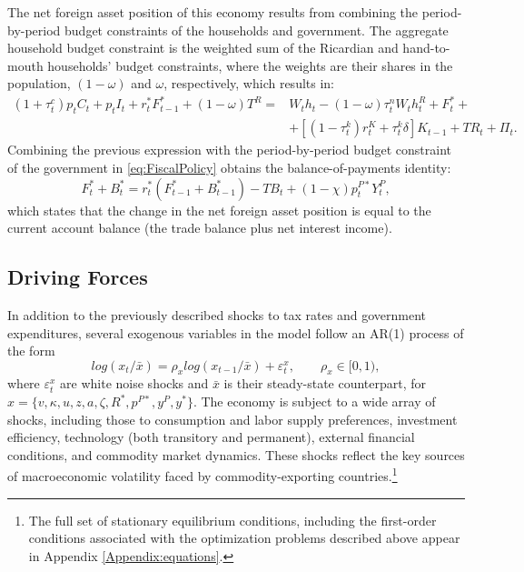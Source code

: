 \documentclass[12pt]{article}
\begin{document}
The net foreign asset position of this economy results from combining the period-by-period budget constraints of the households and government. The aggregate household budget constraint is the weighted sum of the Ricardian and hand-to-mouth households' budget constraints, where the weights are their shares in the population, $(1-\omega)$ and $\omega$, respectively, which results in:
\begin{align*}
(1+\tau^c_t)p_tC_{t}+p_tI_{t}+r^*_tF^{\ast}_{t-1} + (1-\omega)T^R =&W_{t}h_{t} -(1-\omega)\tau^n_tW_{t}h_{t}^R+F^{\ast}_{t} +  \\
& +\left[(1-\tau^k_t)r_{t}^{K}+\tau^k_t\delta \right]K_{t-1} + TR_t + \Pi_t. %
\end{align*}
Combining the previous expression with the period-by-period budget constraint of the government in \eqref{eq:FiscalPolicy} obtains the balance-of-payments identity:
\begin{equation*}
F^{\ast}_t + B_{t}^{\ast }=r_{t}^{\ast }(F^{\ast}_{t-1}+ B_{t-1}^{\ast})-TB_{t}+(1-\chi)p_{t}^{P\ast }Y_{t}^{P}, %
\end{equation*}
which states that the change in the net foreign asset position is equal to the current account balance (the trade balance plus net interest income).

\subsection{Driving Forces}

In addition to the previously described shocks to tax rates and government expenditures, several exogenous variables in the model follow an AR(1) process of the form
\begin{equation*}
    log(x_t/\bar{x})=\rho_x log (x_{t-1}/\bar{x})+\varepsilon_t^x, \qquad \rho_x\in [0,1),
\end{equation*}
\sloppy
where $\varepsilon_t^x$ are white noise shocks and $\bar{x}$ is their steady-state counterpart, for $x=\{v, \kappa, u, z, a, \zeta, R^{\ast}, p^{P*}, y^{P}, y^{\ast}\}$. The economy is subject to a wide array of shocks, including those to consumption and labor supply preferences, investment efficiency, technology (both transitory and permanent), external financial conditions, and commodity market dynamics. These shocks reflect the key sources of macroeconomic volatility faced by commodity-exporting countries.\footnote{The full set of stationary equilibrium conditions, including the first-order conditions associated with the optimization problems described above appear in Appendix \ref{Appendix:equations}.}
\end{document}
